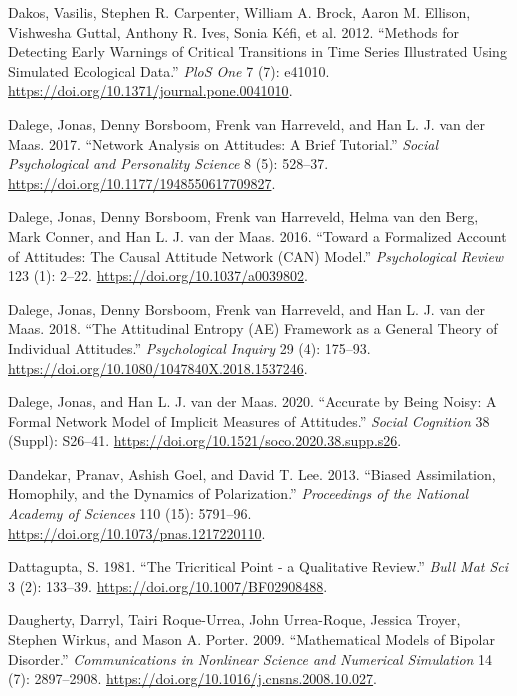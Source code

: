 \documentclass[
  a4paper,
  DIV=11,
  numbers=noendperiod,
  oneside]{scrreprt}
\newlength{\cslhangindent}
\newenvironment{CSLReferences}[2] %
 {\begin{list}{}{%
  \setlength{\itemindent}{0pt}
  \setlength{\leftmargin}{0pt}
  \setlength{\parsep}{0pt}
  \ifodd #1
   \setlength{\leftmargin}{\cslhangindent}
   \setlength{\itemindent}{-1\cslhangindent}
  \fi
  \setlength{\itemsep}{#2\baselineskip}}}
 {\end{list}}
\begin{document}
\begin{CSLReferences}{1}{0}
Dakos, Vasilis, Stephen R. Carpenter, William A. Brock, Aaron M.
Ellison, Vishwesha Guttal, Anthony R. Ives, Sonia Kéfi, et al. 2012.
{``Methods for Detecting Early Warnings of Critical Transitions in Time
Series Illustrated Using Simulated Ecological Data.''} \emph{PloS One} 7
(7): e41010. \url{https://doi.org/10.1371/journal.pone.0041010}.

Dalege, Jonas, Denny Borsboom, Frenk van Harreveld, and Han L. J. van
der Maas. 2017. {``Network Analysis on Attitudes: A Brief Tutorial.''}
\emph{Social Psychological and Personality Science} 8 (5): 528--37.
\url{https://doi.org/10.1177/1948550617709827}.

Dalege, Jonas, Denny Borsboom, Frenk van Harreveld, Helma van den Berg,
Mark Conner, and Han L. J. van der Maas. 2016. {``Toward a Formalized
Account of Attitudes: {The Causal Attitude Network} ({CAN}) Model.''}
\emph{Psychological Review} 123 (1): 2--22.
\url{https://doi.org/10.1037/a0039802}.

Dalege, Jonas, Denny Borsboom, Frenk van Harreveld, and Han L. J. van
der Maas. 2018. {``The {Attitudinal Entropy} ({AE}) Framework as a
General Theory of Individual Attitudes.''} \emph{Psychological Inquiry}
29 (4): 175--93. \url{https://doi.org/10.1080/1047840X.2018.1537246}.

Dalege, Jonas, and Han L. J. van der Maas. 2020. {``Accurate by Being
Noisy: {A} Formal Network Model of Implicit Measures of Attitudes.''}
\emph{Social Cognition} 38 (Suppl): S26--41.
\url{https://doi.org/10.1521/soco.2020.38.supp.s26}.

Dandekar, Pranav, Ashish Goel, and David T. Lee. 2013. {``Biased
Assimilation, Homophily, and the Dynamics of Polarization.''}
\emph{Proceedings of the National Academy of Sciences} 110 (15):
5791--96. \url{https://doi.org/10.1073/pnas.1217220110}.

Dattagupta, S. 1981. {``The Tricritical Point - a Qualitative Review.''}
\emph{Bull Mat Sci} 3 (2): 133--39.
\url{https://doi.org/10.1007/BF02908488}.

Daugherty, Darryl, Tairi Roque-Urrea, John Urrea-Roque, Jessica Troyer,
Stephen Wirkus, and Mason A. Porter. 2009. {``Mathematical Models of
Bipolar Disorder.''} \emph{Communications in Nonlinear Science and
Numerical Simulation} 14 (7): 2897--2908.
\url{https://doi.org/10.1016/j.cnsns.2008.10.027}.


\end{CSLReferences}
\end{document}
